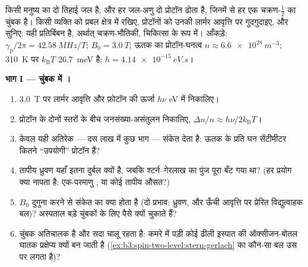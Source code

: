\begin{problem}\label{pb:b3:spin-two-level:1}
किसी मनुष्य का दो तिहाई जल है; और हर जल-अणु दो प्रोटॉन ढोता है, जिनमें
से हर एक चक्रण-$\tfrac12$ का चुंबक है। किसी व्यक्ति को प्रबल
क्षेत्र में रखिए, प्रोटॉनों को उनकी लार्मर आवृत्ति पर गुदगुदाइए, और
सुनिए: यही  प्रतिबिंबन है, अर्थात् चक्रण-भौतिकी, चिकित्सा
के रूप में। आँकड़े:
$\gamma_{\text{p}}/2\pi = \qty{42.58}{MHz/T}$; $B_0 = \qty{3.0}{T}$;
ऊतक का प्रोटॉन-घनत्व $n \approx \qty{6.6e28}{m^{-3}}$;
\qty{310}{K} पर $k_{\text{B}}T$ \qty{26.7}{meV} है; $h =
\qty{4.14e-15}{eV.s}$।

\medskip\noindent\textbf{भाग I --- चुंबक में ।}
\begin{enumerate}
  \item \qty{3.0}{T} पर लार्मर आवृत्ति और फ़ोटॉन की ऊर्जा
        $h\nu$ eV में निकालिए।
  \item प्रोटॉन के दोनों स्तरों के बीच जनसंख्या-असंतुलन निकालिए,
        $\Delta n/n \approx h\nu/2k_{\text{B}}T$।
  \item केवल यही अतिरेक --- दस लाख में कुछ भाग --- संकेत देता है:
        ऊतक के प्रति घन सेंटीमीटर कितने ``उपयोगी'' प्रोटॉन हैं?
  \item तापीय ध्रुवण यहाँ इतना दुर्बल क्यों है, जबकि
        श्टर्न--गेरलाख का पुंज पूरा बँट गया था? (हर प्रयोग क्या नापता
        है: एक-परमाणु , या कोई तापीय
        औसत?)
  \item $B_0$ दुगुना करने से संकेत का क्या होता है (दो प्रभाव:
        ध्रुवण, और ऊँची आवृत्ति पर प्रेरित विद्युत्वाहक बल)? अस्पताल
        बड़े चुंबकों के लिए पैसे क्यों चुकाते हैं?
  \item चुंबक अतिचालक है और सदा चालू रहता है: कमरे में पड़ी कोई
        ढीली इस्पात की ऑक्सीजन-बोतल घातक प्रक्षेप्य क्यों बन जाती है
        (\cref{ex:b3:spin-two-level:stern-gerlach} का कौन-सा बल
        उस पर लगता है)?
\end{enumerate}


\end{problem}
